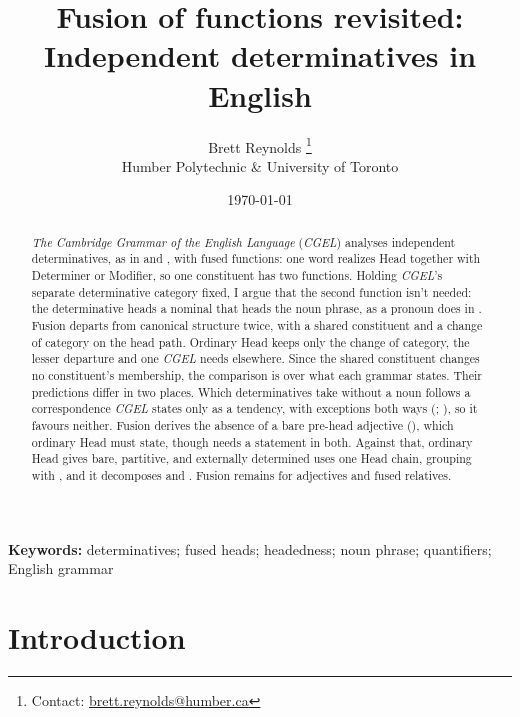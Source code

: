 \documentclass[12pt]{article}
\title{Fusion of functions revisited: Independent determinatives in English}
\author{Brett Reynolds \orcidlink{0000-0003-0073-7195}%
\thanks{Contact: \href{mailto:brett.reynolds@humber.ca}{brett.reynolds@humber.ca}}\\
Humber Polytechnic \& University of Toronto}
\date{\today}
\begin{document}
\maketitle

\begin{abstract}
\textit{The Cambridge Grammar of the English Language} (\textit{CGEL}) analyses independent determinatives, as in  and , with fused functions: one word realizes Head together with Determiner or Modifier, so one constituent has two functions. Holding \textit{CGEL}'s separate determinative category fixed, I argue that the second function isn't needed: the determinative heads a nominal that heads the noun phrase, as a pronoun does in . Fusion departs from canonical structure twice, with a shared constituent and a change of category on the head path. Ordinary Head keeps only the change of category, the lesser departure and one \textit{CGEL} needs elsewhere. Since the shared constituent changes no constituent's membership, the comparison is over what each grammar states. Their predictions differ in two places. Which determinatives take  without a noun follows a correspondence \textit{CGEL} states only as a tendency, with exceptions both ways (; ), so it favours neither. Fusion derives the absence of a bare pre-head adjective (), which ordinary Head must state, though  needs a statement in both. Against that, ordinary Head gives bare, partitive, and externally determined uses one Head chain, grouping  with , and it decomposes  and . Fusion remains for adjectives and fused relatives.
\end{abstract}

\noindent\textbf{Keywords:} determinatives; fused heads; headedness; noun phrase; quantifiers; English grammar


\section{Introduction}\label{sec:intro}
\end{document}
